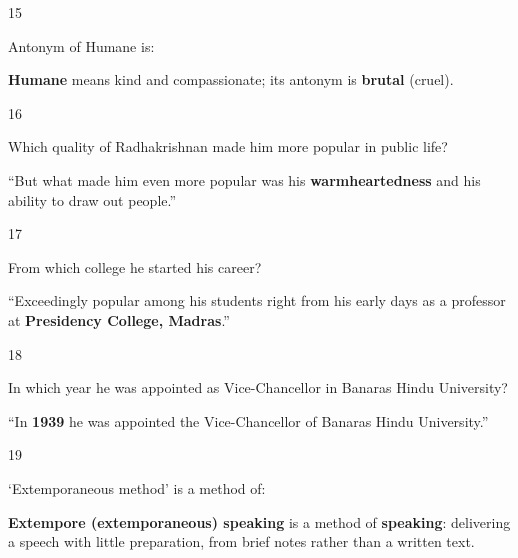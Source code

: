 \begin{question}{15}
{Antonym of Humane is:\par}
\begin{explain}
\textbf{Humane} means kind and compassionate; its antonym is \textbf{brutal} (cruel).
\end{explain}
\end{question}

\begin{question}{16}
{Which quality of Radhakrishnan made him more popular in public life?\par}
\begin{explain}
``But what made him even more popular was his \textbf{warmheartedness} and his ability to draw out people.''
\end{explain}
\end{question}

\begin{question}{17}
{From which college he started his career?\par}
\begin{explain}
``Exceedingly popular among his students right from his early days as a professor at \textbf{Presidency College, Madras}.''
\end{explain}
\end{question}

\begin{question}{18}
{In which year he was appointed as Vice-Chancellor in Banaras Hindu University?\par}
\begin{explain}
``In \textbf{1939} he was appointed the Vice-Chancellor of Banaras Hindu University.''
\end{explain}
\end{question}

\begin{question}{19}
{`Extemporaneous method' is a method of:\par}
\begin{explain}
\textbf{Extempore (extemporaneous) speaking} is a method of \textbf{speaking}: delivering a speech with little preparation, from brief notes rather than a written text.
\end{explain}
\end{question}

